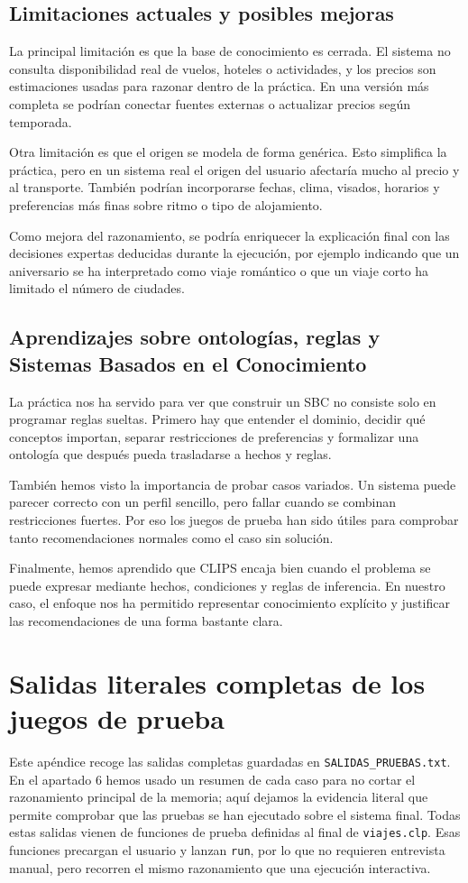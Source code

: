\documentclass[11pt,a4paper]{article}
\begin{document}
\subsection{Limitaciones actuales y posibles mejoras}
La principal limitaci\'on es que la base de conocimiento es cerrada. El sistema
no consulta disponibilidad real de vuelos, hoteles o actividades, y los precios
son estimaciones usadas para razonar dentro de la pr\'actica. En una versi\'on
m\'as completa se podr\'ian conectar fuentes externas o actualizar precios seg\'un
temporada.

Otra limitaci\'on es que el origen se modela de forma gen\'erica. Esto simplifica
la pr\'actica, pero en un sistema real el origen del usuario afectar\'ia mucho al
precio y al transporte. Tambi\'en podr\'ian incorporarse fechas, clima, visados,
horarios y preferencias m\'as finas sobre ritmo o tipo de alojamiento.

Como mejora del razonamiento, se podr\'ia enriquecer la explicaci\'on final con
las decisiones expertas deducidas durante la ejecuci\'on, por ejemplo indicando
que un aniversario se ha interpretado como viaje rom\'antico o que un viaje
corto ha limitado el n\'umero de ciudades.

\subsection{Aprendizajes sobre ontolog\'ias, reglas y Sistemas Basados en el Conocimiento}
La pr\'actica nos ha servido para ver que construir un SBC no consiste solo en
programar reglas sueltas. Primero hay que entender el dominio, decidir qu\'e
conceptos importan, separar restricciones de preferencias y formalizar una
ontolog\'ia que despu\'es pueda trasladarse a hechos y reglas.

Tambi\'en hemos visto la importancia de probar casos variados. Un sistema puede
parecer correcto con un perfil sencillo, pero fallar cuando se combinan
restricciones fuertes. Por eso los juegos de prueba han sido \'utiles para
comprobar tanto recomendaciones normales como el caso sin soluci\'on.

Finalmente, hemos aprendido que CLIPS encaja bien cuando el problema se puede
expresar mediante hechos, condiciones y reglas de inferencia. En nuestro caso,
el enfoque nos ha permitido representar conocimiento expl\'icito y justificar
las recomendaciones de una forma bastante clara.

\appendix
\section{Salidas literales completas de los juegos de prueba}
Este ap\'endice recoge las salidas completas guardadas en
\texttt{SALIDAS\_PRUEBAS.txt}. En el apartado 6 hemos usado un resumen de cada
caso para no cortar el razonamiento principal de la memoria; aqu\'i dejamos la
evidencia literal que permite comprobar que las pruebas se han ejecutado sobre
el sistema final. Todas estas salidas vienen de funciones de prueba definidas
al final de \texttt{viajes.clp}. Esas funciones precargan el usuario y lanzan
\texttt{run}, por lo que no requieren entrevista manual, pero recorren el mismo
razonamiento que una ejecuci\'on interactiva.
\end{document}
